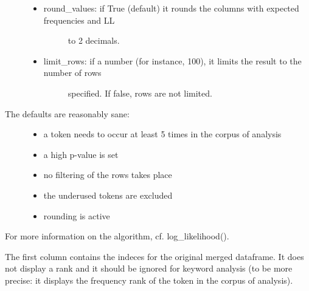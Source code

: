 \documentclass[letterpaper,10pt,english]{sphinxmanual}
\begin{document}
\begin{fulllineitems}
\begin{description}
\begin{itemize}
\begin{description}
\end{description}

\item {} \begin{description}
\item[{round\_values: if True (default) it rounds the columns with expected frequencies and LL }] \leavevmode
to 2 decimals.

\end{description}

\item {} \begin{description}
\item[{limit\_rows: if a number (for instance, 100), it limits the result to the number of rows }] \leavevmode
specified. If false, rows are not limited.

\end{description}

\end{itemize}

\item[{The defaults are reasonably sane: }] \leavevmode\begin{itemize}
\item {} 
a token needs to occur at least 5 times in the corpus of analysis

\item {} 
a high p-value is set

\item {} 
no filtering of the rows takes place

\item {} 
the underused tokens are excluded

\item {} 
rounding is active

\end{itemize}

\end{description}

For more information on the algorithm, cf. log\_likelihood().

The first column contains the indeces for the original merged dataframe. It does not display
a rank and it should be ignored for keyword analysis (to be more precise: it displays the 
frequency rank of the token in the corpus of analysis).

\end{fulllineitems}

\end{document}
